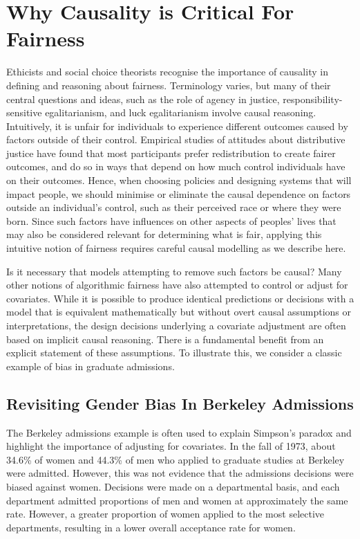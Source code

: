 \documentclass{article}
\begin{document}
\section{Why Causality is Critical For Fairness}
\label{sec:why_causality}
Ethicists and social choice theorists recognise the importance of causality
in defining and reasoning about fairness. Terminology varies,
but many of their central questions and ideas, such as the role of agency
in justice, responsibility-sensitive egalitarianism, and luck egalitarianism
\cite{richard1988equality, cohen1989currency, dworkin2002sovereign}
involve causal reasoning. Intuitively, it is unfair
for individuals to experience different outcomes caused by factors
outside of their control.
Empirical studies
of attitudes about distributive justice
\cite{cappelen2013just, mollerstrom2015luck}
have found that most participants prefer redistribution to create
fairer outcomes, and do so in ways that depend on how much control
individuals have on their outcomes.
Hence, when choosing policies and designing systems
that will impact people, we should minimise or eliminate the
causal dependence on factors outside an individual's control, such as
their perceived race
or where they were born. Since such factors have influences on other
aspects of peoples' lives that may also be considered relevant for
determining what is fair, applying this intuitive notion of fairness
requires careful causal modelling as we describe here.

Is it necessary that models attempting to remove such factors be causal? Many
other notions of algorithmic fairness have also attempted to control or adjust
for covariates. While it is possible to produce identical predictions or
decisions with a model that is equivalent mathematically but without overt
causal assumptions or interpretations, the design decisions underlying
a covariate adjustment are often based on implicit causal reasoning. There is a fundamental benefit from an explicit statement of these assumptions. To illustrate this, we consider a classic example of bias in graduate admissions.

\subsection{Revisiting Gender Bias In Berkeley Admissions}

The Berkeley admissions example \cite{bickel1975sex} is often used to
explain Simpson's paradox 
\cite{simpson1951interpretation} and highlight the importance of adjusting
for covariates. In the fall of 1973, about 34.6\% of women and 44.3\% of
men who applied to graduate studies at Berkeley were admitted. However,
this was not evidence that the admissions decisions were biased against
women. Decisions were made on a departmental basis, and each department
admitted proportions of men and women at approximately the same rate.
However, a greater proportion of women applied to the most selective departments,
resulting in a lower overall acceptance rate for women.
\end{document}
